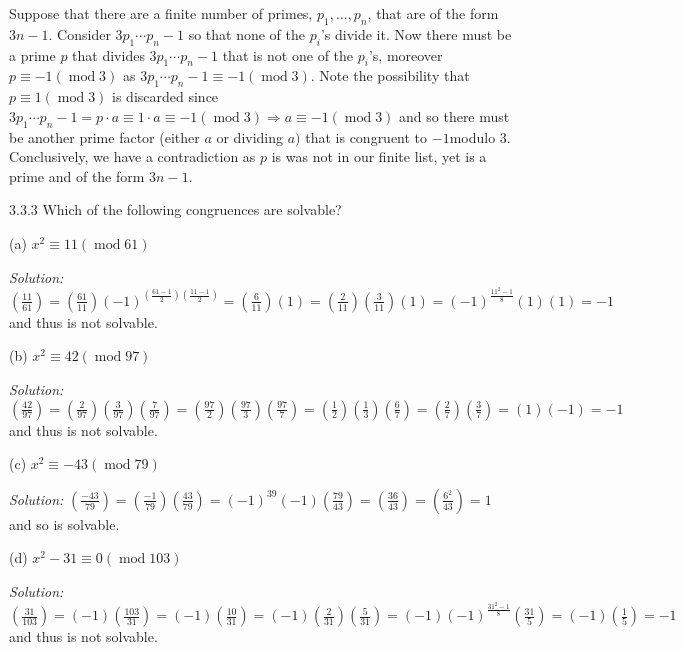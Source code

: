 \documentclass{letter}
\newcommand{\tmem}[1]{{\em #1\/}}
\newcommand{\tmop}[1]{\ensuremath{\operatorname{#1}}}
\begin{document}
Suppose that there are a finite number of primes, $p_1, \ldots, p_n$, that are
of the form $3 n - 1$. Consider $3 p_1 \cdots p_n - 1$ so that none of the
$p_i$'s divide it. Now there must be a prime $p$ that divides $3 p_1 \cdots
p_n - 1$ that is not one of the $p_i$'s, moreover $p \equiv - 1 (\tmop{mod}
3)$ as $3 p_1 \cdots p_n - 1 \equiv - 1 (\tmop{mod} 3)$. Note the possibility
that $p \equiv 1 (\tmop{mod} 3)$ is discarded since $3 p_1 \cdots p_n - 1 = p
\cdot a \equiv 1 \cdot a \equiv - 1 (\tmop{mod} 3) \Rightarrow a \equiv - 1
(\tmop{mod} 3)$ and so there must be another prime factor (either $a$ or
dividing $a)$ that is congruent to $- 1$modulo 3. Conclusively, we have a
contradiction as $p$ is was not in our finite list, yet is a prime and of the
form $3 n - 1$.

3.3.3 Which of the following congruences are solvable?

(a) $x^2 \equiv 11 (\tmop{mod} 61)$

{\tmem{Solution:}} $\left( \frac{11}{61} \right) = \left( \frac{61}{11}
\right) (- 1)^{( \frac{61 - 1}{2}) ( \frac{11 - 1}{2})} = \left( \frac{6}{11}
\right) (1) = \left( \frac{2}{11} \right) \left( \frac{3}{11} \right) (1) = (-
1)^{\frac{11^2 - 1}{8}} (1) (1) = - 1$ and thus is not solvable.

(b) $x^2 \equiv 42 (\tmop{mod} 97)$

{\tmem{Solution:}} $\left( \frac{42}{97} \right) = \left( \frac{2}{97} \right)
\left( \frac{3}{97} \right) \left( \frac{7}{97} \right) = \left( \frac{97}{2}
\right) \left( \frac{97}{3} \right) \left( \frac{97}{7} \right) = \left(
\frac{1}{2} \right) \left( \frac{1}{3} \right) \left( \frac{6}{7} \right) =
\left( \frac{2}{7} \right) \left( \frac{3}{7} \right) = (1) (- 1) = - 1$ and
thus is not solvable.

(c) $x^2 \equiv - 43 (\tmop{mod} 79)$

{\tmem{Solution:}} $\left( \frac{- 43}{79} \right) = \left( \frac{- 1}{79}
\right) \left( \frac{43}{79} \right) = (- 1)^{39} (- 1) \left( \frac{79}{43}
\right) = \left( \frac{36}{43} \right) = \left( \frac{6^2}{43} \right) = 1$
and so is solvable.

(d) $x^2 - 31 \equiv 0 (\tmop{mod} 103)$

{\tmem{Solution:}} $\left( \frac{31}{103} \right) = (- 1) \left(
\frac{103}{31} \right) = (- 1) \left( \frac{10}{31} \right) = (- 1) \left(
\frac{2}{31} \right) \left( \frac{5}{31} \right) = (- 1) (- 1)^{\frac{31^2 -
1}{8}} \left( \frac{31}{5} \right) = (- 1) \left( \frac{1}{5} \right) = - 1$
and thus is not solvable.
\end{document}
